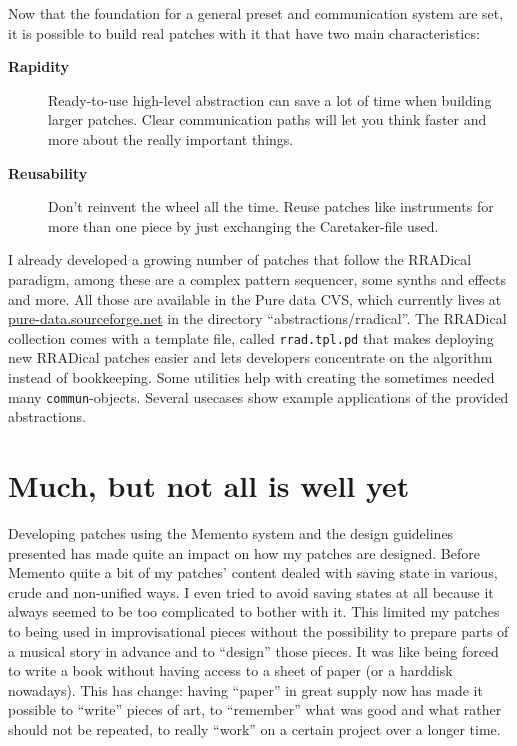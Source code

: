 \documentclass[10pt,english]{scrartcl}
\begin{document}
Now that the foundation for a general preset and communication system are
set, it is possible to build real patches with it that have two main
characteristics:
\begin{description}
\item[\textbf{Rapidity}]

Ready-to-use high-level abstraction can save a lot of time when building
larger patches. Clear communication paths will let you think faster and
more about the really important things.

\item[\textbf{Reusability}]

Don't reinvent the wheel all the time. Reuse patches like instruments
for more than one piece by just exchanging the Caretaker-file used.

\end{description}

I already developed a growing number of patches that follow the RRADical
paradigm, among these are a complex pattern sequencer, some synths and
effects and more. All those are available in the Pure data CVS, which
currently lives at \href{http://pure-data.sourceforge.net}{pure-data.sourceforge.net} in the directory
``abstractions/rradical''.
The RRADical collection comes with a template file, called
\texttt{rrad.tpl.pd} that makes deploying new RRADical patches easier and lets
developers concentrate on the algorithm instead of bookkeeping. Some
utilities help with creating the sometimes needed many \texttt{commun}-objects.
Several usecases show example applications of the provided abstractions.



\hypertarget{much-but-not-all-is-well-yet}{}
\section*{Much, but not all is well yet}

Developing patches using the Memento system and the design guidelines
presented has made quite an impact on how my patches are designed. Before
Memento quite a bit of my patches' content dealed with saving state in
various, crude and non-unified ways. I even tried to avoid saving states at
all because it always seemed to be too complicated to bother with it. This
limited my patches to being used in improvisational pieces without the
possibility to prepare parts of a musical story in advance and to ``design''
those pieces. It was like being forced to write a book without having access
to a sheet of paper (or a harddisk nowadays). This has change: having
``paper'' in great supply now has made it possible to ``write'' pieces of art,
to ``remember'' what was good and what rather should not be repeated, to
really ``work'' on a certain project over a longer time.
\end{document}
